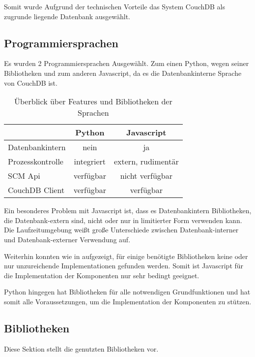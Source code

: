 Somit wurde Aufgrund der technischen Vorteile das System CouchDB als zugrunde liegende Datenbank ausgewählt.

\subsection{Programmiersprachen}

Es wurden 2 Programmiersprachen Ausgew\"ahlt.
Zum einen Python, wegen seiner Bibliotheken und
zum anderen Javascript, da es die Datenbankinterne Sprache von CouchDB ist.

\begin{table}[ht]
\centering
\begin{tabular}{l|c|c}
                            & \textbf{Python} & \textbf{Javascript} \\
    \hline
    Datenbankintern         & nein            & ja \\
    Prozesskontrolle        & integriert      & extern, rudimentär \\
    SCM Api                 & verfügbar       & nicht verfügbar \\
    CouchDB Client          & verfügbar       & verfügbar \\
\end{tabular}
\caption{Überblick über Features und Bibliotheken der Sprachen}
\label{tab:python-vs-js}
\end{table}

Ein besonderes Problem mit Javascript ist,
dass es Datenbankintern Bibliotheken, die Datenbank-extern sind,
nicht oder nur in limitierter Form verwenden kann.
Die Laufzeitumgebung weißt große Unterschiede
zwischen Datenbank-interner und Datenbank-externer Verwendung auf.

Weiterhin konnten wie in  aufgezeigt,
für einige benötigte Bibliotheken keine
oder nur unzureichende Implementationen gefunden werden.
Somit ist Javascript für die Implementation der Komponenten
nur sehr bedingt geeignet.

Python hingegen hat Bibliotheken für alle notwendigen Grundfunktionen
und hat somit alle Voraussetzungen,
um die Implementation der Komponenten zu stützen.

\subsection{Bibliotheken}

Diese Sektion stellt die genutzten Bibliotheken vor.

